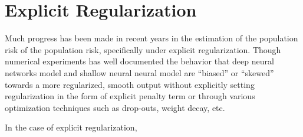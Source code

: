 \chapter{Explicit Regularization}

Much progress has been made in recent years in the estimation of the population risk of the population risk, specifically under explicit regularization.
Though numerical experiments has well documented \TOCITE the behavior that deep neural networks model and shallow neural neural model are ``biased'' or ``skewed'' towards 
a more regularized, smooth output without explicitly setting regularization in the form of explicit penalty term or through various 
optimization techniques such as drop-outs, weight decay, etc.

In the case of explicit regularization, 


